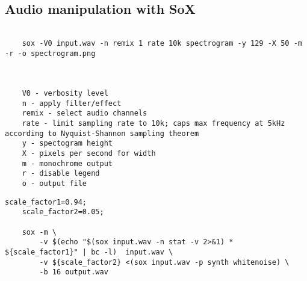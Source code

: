 \begin{appendices}
\section{Audio manipulation with SoX}
\label{sec:appendix_a}

    \begin{lstlisting}[caption={Generating monochrome spectrograms with SoX}, label={lst:spectrograms}]
    
    sox -V0 input.wav -n remix 1 rate 10k spectrogram -y 129 -X 50 -m -r -o spectrogram.png
    
    
    
    V0 - verbosity level 
    n - apply filter/effect
    remix - select audio channels
    rate - limit sampling rate to 10k; caps max frequency at 5kHz according to Nyquist-Shannon sampling theorem
    y - spectogram height
    X - pixels per second for width
    m - monochrome output
    r - disable legend
    o - output file
    \end{lstlisting}
    
    \begin{lstlisting}[caption=Adding white noise to an audio file]
    scale_factor1=0.94; 
    scale_factor2=0.05;
     
    sox -m \
        -v $(echo "$(sox input.wav -n stat -v 2>&1) * ${scale_factor1}" | bc -l)  input.wav \
        -v ${scale_factor2} <(sox input.wav -p synth whitenoise) \
        -b 16 output.wav
   \end{lstlisting}

\end{appendices}